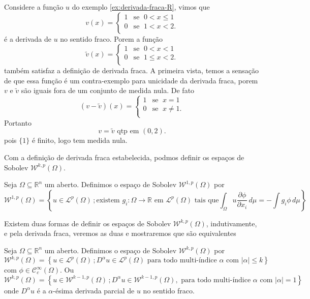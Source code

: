 \documentclass[a4paper, 11pt]{book}
\theoremstyle{definition}
\newcommand{\bR}{\mathbb{R}}
\newcommand{\cC}{\mathcal{C}}
\newcommand{\cL}{\mathcal{L}}
\newcommand{\cW}{\mathcal{W}}
\begin{document}
\begin{ex}
    Considere a função $u$ do exemplo \ref{ex:derivada-fraca-R}, vimos que
    \[
        v(x) = \left\{
            \begin{array}{rl}
                1 & \text{se }\; 0 < x \leqslant 1\\
                0 & \text{se }\; 1 < x < 2.\\
            \end{array}
        \right.
    \]
    é a derivada de $u$ no sentido fraco.
    Porem a função
    \[
        \tilde v(x) = \left\{
            \begin{array}{rl}
                1 & \text{se }\; 0 < x < 1\\
                0 & \text{se }\; 1 \leqslant x < 2.\\
            \end{array}
        \right.
    \]
    também satisfaz a definição de derivada fraca.
    A primeira vista, temos a sensação de que essa função é um contra-exemplo para unicidade da derivada fraca, porem $v$ e $\tilde v$ são iguais fora de um conjunto de medida nula.
    De fato
    \[
        (v - \tilde v)(x) = \left\{
            \begin{array}{rl}
                1 & \text{se }\; x = 1\\
                0 & \text{se }\; x \neq 1.\\
            \end{array}
        \right.
    \]
    Portanto
    \[
        v = \tilde v \text{ qtp em } (0,2).
    \]
    pois $\{1\}$ é finito, logo tem medida nula.
\end{ex}

Com a definição de derivada fraca estabelecida, podmos definir os espaços de Sobolev $\cW^{k,p}(\Omega)$.

\begin{dbox}
    Seja $\Omega \subseteq \bR^n$ um aberto. 
    Definimos o espaço de Sobolev $\cW^{1,p}(\Omega)$ por
    \[
        \cW^{1,p}(\Omega) = \left\{u \in \cL^p(\Omega) \,; \text{existem } g_i : \Omega \to \bR \text{ em $\cL^p(\Omega)$ tais que} \int_\Omega u \dfrac{\partial \phi}{\partial x_i} \, d\mu = -\!\!\int g_i \phi \,d\mu \right\}
    \]
\end{dbox}

Existem duas formas de definir os espaços de Sobolev $\cW^{k,p}(\Omega)$, indutivamente, e pela derivada fraca, veremos as duas e mostraremos que são equivalentes

\begin{dbox}
    Seja $\Omega \subseteq \bR ^n$ um aberto. Definimos o espaço de Sobolev $\cW^{k,p}(\Omega)$ por
    \[
        \cW^{k,p}(\Omega) = \left\{ u \in \cL^p(\Omega) \,; D^\alpha u \in \cL^p(\Omega) \text{ para todo multi-índice } \alpha \text{ com } |\alpha| \leqslant k\right\}
    \]
    com $\phi \in \cC^\infty_c(\Omega)$. 
    Ou
    \[
        \cW^{k,p}(\Omega) = \left\{ u \in \cW^{k-1,p}(\Omega) \,; D^\alpha u \in \cW^{k-1,p}(\Omega) , \text{ para todo multi-índice } \alpha \text{ com } |\alpha| = 1\right\}
    \]
    onde $D^\alpha u$ é a $\alpha$-ésima derivada parcial de $u$ no sentido fraco.
\end{dbox}
\end{document}
